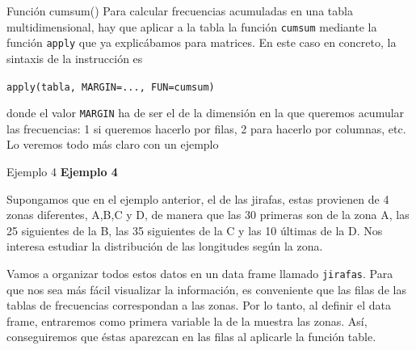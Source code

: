 \documentclass[
  ignorenonframetext,
]{beamer}
\begin{document}
\begin{frame}[fragile]{Función cumsum()}
\label{funciuxf3n-cumsum-11}
Para calcular frecuencias acumuladas en una tabla multidimensional, hay
que aplicar a la tabla la función \texttt{cumsum} mediante la función
\texttt{apply} que ya explicábamos para matrices. En este caso en
concreto, la sintaxis de la instrucción es

\texttt{apply(tabla,\ MARGIN=...,\ FUN=cumsum)}

donde el valor \texttt{MARGIN} ha de ser el de la dimensión en la que
queremos acumular las frecuencias: 1 si queremos hacerlo por filas, 2
para hacerlo por columnas, etc. Lo veremos todo más claro con un ejemplo
\end{frame}

\begin{frame}[fragile]{Ejemplo 4}
\label{ejemplo-4-7}
\textbf{Ejemplo 4}

Supongamos que en el ejemplo anterior, el de las jirafas, estas
provienen de 4 zonas diferentes, A,B,C y D, de manera que las 30
primeras son de la zona A, las 25 siguientes de la B, las 35 siguientes
de la C y las 10 últimas de la D. Nos interesa estudiar la distribución
de las longitudes según la zona.

Vamos a organizar todos estos datos en un data frame llamado
\texttt{jirafas}. Para que nos sea más fácil visualizar la información,
es conveniente que las filas de las tablas de frecuencias correspondan a
las zonas. Por lo tanto, al definir el data frame, entraremos como
primera variable la de la muestra las zonas. Así, conseguiremos que
éstas aparezcan en las filas al aplicarle la función table.
\end{frame}
\end{document}
